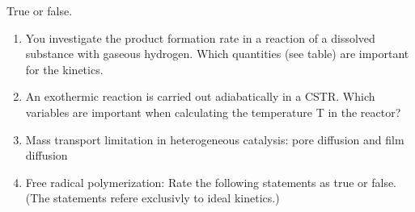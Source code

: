 \begin{question}
True or false.
\renewcommand{\labelenumi}{\alph{enumi})}
\begin{enumerate}
 \item You investigate the product formation rate in a reaction of a dissolved substance with gaseous hydrogen. Which quantities (see table) are important for the kinetics.
 \item An exothermic reaction is carried out adiabatically in a CSTR. Which variables are important when calculating the temperature T in the reactor?
 \item Mass transport limitation in heterogeneous catalysis: pore diffusion and film diffusion
 \item Free radical polymerization: Rate the following statements as true or false. (The statements refere exclusivly to ideal kinetics.)
\end{enumerate}
\end{question}

